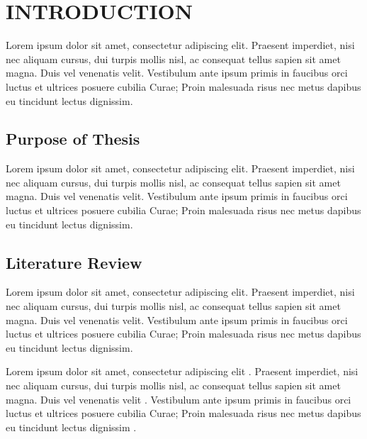 \chapter{INTRODUCTION}\label{introduction}
Lorem ipsum dolor sit amet, consectetur adipiscing elit. Praesent imperdiet, nisi 
nec aliquam cursus, dui turpis mollis nisl, ac consequat tellus sapien sit amet 
magna. Duis vel venenatis velit. Vestibulum ante ipsum primis in faucibus orci 
luctus et ultrices posuere cubilia Curae; Proin malesuada risus nec metus dapibus 
eu tincidunt lectus dignissim. 

\section{Purpose of Thesis}\label{purposeofthesis}

Lorem ipsum dolor sit amet, consectetur adipiscing elit. Praesent imperdiet, nisi 
nec aliquam cursus, dui turpis mollis nisl, ac consequat tellus sapien sit amet 
magna. Duis vel venenatis velit. Vestibulum ante ipsum primis in faucibus orci 
luctus et ultrices posuere cubilia Curae; Proin malesuada risus nec metus dapibus 
eu tincidunt lectus dignissim. 

\section{Literature Review}\label{literaturereview}

Lorem ipsum dolor sit amet, consectetur adipiscing elit. Praesent imperdiet, nisi 
nec aliquam cursus, dui turpis mollis nisl, ac consequat tellus sapien sit amet 
magna. Duis vel venenatis velit. Vestibulum ante ipsum primis in faucibus orci 
luctus et ultrices posuere cubilia Curae; Proin malesuada risus nec metus dapibus 
eu tincidunt lectus dignissim. 

Lorem ipsum dolor sit amet, consectetur adipiscing elit \cite{HYP:HYP57}. Praesent imperdiet, nisi 
nec aliquam cursus, dui turpis mollis nisl, ac consequat tellus sapien sit amet 
magna. Duis vel venenatis velit \cite{Box:1990:TSA:574978}. Vestibulum ante ipsum primis in faucibus orci 
luctus et ultrices posuere cubilia Curae; Proin malesuada risus nec metus dapibus 
eu tincidunt lectus dignissim \cite{17590413}. 

